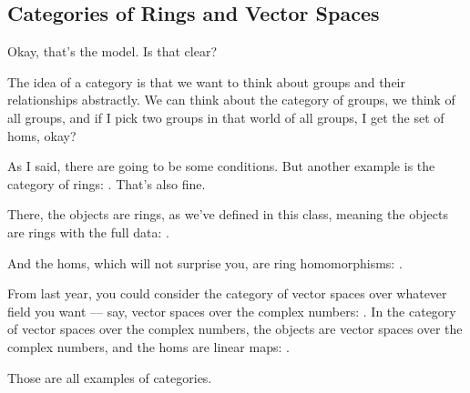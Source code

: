 \subsection{Categories of Rings and Vector Spaces}

\begin{speech}[01:09:10 - 01:10:24]
Okay, that's the model. Is that clear?

The idea of a category is that we want to think about groups and their relationships abstractly. We can think about the category of groups, we think of all groups, and if I pick two groups in that world of all groups, I get the set of homs, okay?

As I said, there are going to be some conditions. But another example is the category of rings: . That's also fine.

There, the objects are rings, as we've defined in this class, meaning the objects are rings with the full data: .

And the homs, which will not surprise you, are ring homomorphisms: .

From last year, you could consider the category of vector spaces over whatever field you want --- say, vector spaces over the complex numbers: . In the category of vector spaces over the complex numbers, the objects are vector spaces over the complex numbers, and the homs are linear maps: .

Those are all examples of categories.
\end{speech}

\begin{content}

\end{content}

